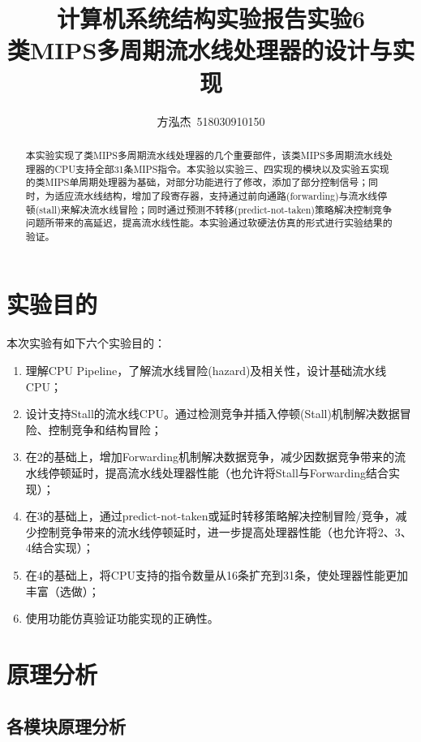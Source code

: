 \documentclass{cumcm}
\title{\textbf{计算机系统结构实验报告\quad 实验6}\\{\Large 类MIPS多周期流水线处理器的设计与实现}}
\author{方泓杰\ 518030910150}
\numberwithin{equation}{section}
\numberwithin{equation}{subsection}
\begin{document}
\maketitle

\begin{abstract}
  本实验实现了类MIPS多周期流水线处理器的几个重要部件，该类MIPS多周期流水线处理器的CPU支持全部31条MIPS指令。本实验以实验三、四实现的模块以及实验五实现的类MIPS单周期处理器为基础，对部分功能进行了修改，添加了部分控制信号；同时，为适应流水线结构，增加了段寄存器，支持通过前向通路(forwarding)与流水线停顿(stall)来解决流水线冒险；同时通过预测不转移(predict-not-taken)策略解决控制竞争问题所带来的高延迟，提高流水线性能。本实验通过软硬法仿真的形式进行实验结果的验证。
\end{abstract}

\maketitle \tableofcontents
\newpage

\section{实验目的}\label{section1}
本次实验有如下六个实验目的：
\begin{enumerate}
    \item 理解CPU Pipeline，了解流水线冒险(hazard)及相关性，设计基础流水线CPU；
    \item 设计支持Stall的流水线CPU。通过检测竞争并插入停顿(Stall)机制解决数据冒险、控制竞争和结构冒险；
    \item 在2的基础上，增加Forwarding机制解决数据竞争，减少因数据竞争带来的流水线停顿延时，提高流水线处理器性能（也允许将Stall与Forwarding结合实现）；
    \item 在3的基础上，通过predict-not-taken或延时转移策略解决控制冒险/竞争，减少控制竞争带来的流水线停顿延时，进一步提高处理器性能（也允许将2、3、4结合实现）；
    \item 在4的基础上，将CPU支持的指令数量从16条扩充到31条，使处理器性能更加丰富（选做）；
    \item 使用功能仿真验证功能实现的正确性。
\end{enumerate}

\section{原理分析}\label{section2}

\subsection{各模块原理分析}\label{section2.1}
\end{document}
